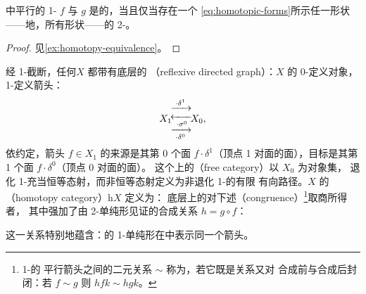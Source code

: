 \begin{lemma}\label{lem:homotopic-quasi-category}
\trQuasiCategory{}中平行的 1-\trSimplex{} $f$ 与 $g$ 是\trHomotopy{}的，当且仅当存在一个
\eqref{eq:homotopic-forms}所示任一形状——\trEquivalence{}地，所有形状——的
2-\trSimplex{}。
\end{lemma}
\begin{proof}
见\cref{ex:homotopy-equivalence}。
\end{proof}

\begin{definition}\label{def:homotopy-category}
经 1-截断，任何\trSimplicialSet $X$ 都带有底层的\textbf{\trReflexiveDirectedGraph}
（reflexive directed graph）：$X$ 的 0-\trSimplex{}定义对象，1-\trSimplex{}定义箭头：
\[
X_1\!
\begin{array}{@{}c@{}}
\xrightarrow{\;\cdot\delta^1\;}\\[-3pt]
\xleftarrow[\;\cdot\sigma^0\;]{}\\[-3pt]
\xrightarrow[\;\cdot\delta^0\;]{}
\end{array}
\!X_0,
\]
依约定，箭头 $f\in X_1$ 的来源是其第 0 个面 $f\cdot\delta^1$（顶点 1
对面的面），目标是其第 1 个面 $f\cdot\delta^0$（顶点 0 对面的面）。
这个\trReflexiveDirectedGraph{}上的\textbf{\trFreeCategory}（free category）以 $X_0$ 为对象集，
退化 1-\trSimplex{}充当恒等态射，而非恒等态射定义为非退化 1-\trSimplex{}的有限
有向路径。$X$ 的\textbf{\trHomotopyCategory}（homotopy category）$\mathrm{h}X$ 定义为：
底层\trReflexiveDirectedGraph{}上的\trFreeCategory{}对下述\trCongruence{}（congruence）\footnote{1-\trCategory{}的
平行箭头之间的二元关系 $\sim$ 称为\textbf{\trCongruence}，若它既是\trEquivalence{}关系又对
合成前与合成后封闭：若 $f\sim g$ 则 $hfk\sim hgk$。}取商所得者，
其中强加了由 2-单纯形见证的合成关系 $h=g\circ f$：
\begin{center}
\end{center}
这一关系特别地蕴含：\trHomotopy{}的 1-单纯形在\trHomotopyCategory{}中表示同一个箭头。
\end{definition}

